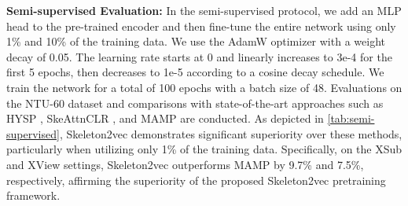 
\noindent \textbf{Semi-supervised Evaluation:}
In the semi-supervised protocol, we add an MLP head to the pre-trained
encoder and then fine-tune the entire network using only 1\% and 10\% of the training data.
We use the AdamW optimizer with a
weight decay of 0.05. The learning rate starts at 0 and linearly increases to 3e-4
for the first 5 epochs, then decreases to 1e-5 according to a cosine decay schedule.
We train the network for a total of 100 epochs with a batch size of 48.
Evaluations on the NTU-60 dataset and comparisons with state-of-the-art approaches
such as HYSP \cite{franco2023hyperbolic}, SkeAttnCLR \cite{Hua2023SkeAttnCLR}, and MAMP
\cite{mao2023masked} are conducted.
As depicted in \cref{tab:semi-supervised},
Skeleton2vec demonstrates significant superiority over these methods, particularly
when utilizing only 1\% of the training data. Specifically, on the XSub and XView
settings, Skeleton2vec outperforms MAMP by 9.7\% and 7.5\%, respectively,
affirming the superiority of the proposed Skeleton2vec pretraining framework.

